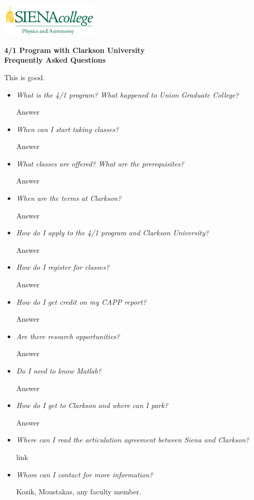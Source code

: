 \documentclass[12pt]{article}
\begin{document}
\hfill \includegraphics[width=0.35\textwidth]{siena_phys_astro_print_crop.jpg}

\vspace{0.2cm}
\begin{center}
  {\Large {\bf 4/1 Program with Clarkson University \\ Frequently Asked
      Questions}} 
\end{center}
\vspace{0.3cm}

\noindent This is good.

\begin{itemize}
\item{{\em What is the 4/1 program?  What happened to Union Graduate College?}

Answer}
\item{{\em When can I start taking classes?}

Answer}
\item{{\em What classes are offered?  What are the prerequisites?}

Answer}
\item{{\em When are the terms at Clarkson?}

Answer}
\item{{\em How do I apply to the 4/1 program and Clarkson University?}

Answer}
\item{{\em How do I register for classes?}

Answer}
\item{{\em How do I get credit on my CAPP report?}

Answer}
\item{{\em Are there research opportunities?}

Answer}
\item{{\em Do I need to know Matlab?}

Answer}
\item{{\em How do I get to Clarkson and where can I park?}

Answer}
\item{{\em Where can I read the articulation agreement between Siena and
    Clarkson?} 

link}
\item{{\em Whom can I contact for more information?}

Kozik, Moustakas, any faculty member.}
\end{itemize}
\end{document}
